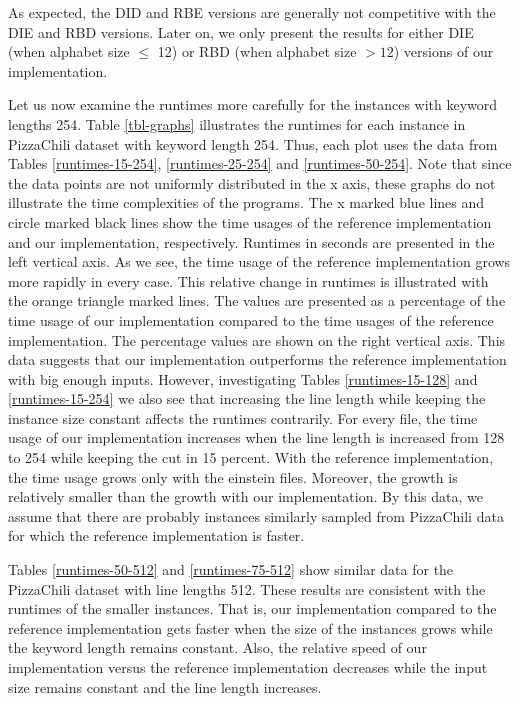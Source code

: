 \documentclass[english,twoside,censored,csm,algorithms-track-2020]{HYthesisML}
\theoremstyle{plain}
\theoremstyle{definition}
\begin{document}
As expected, the DID and RBE versions are generally not competitive with the DIE
and RBD versions.
Later on, we only present the results for either DIE (when alphabet size $\leq$ 12)
or RBD (when alphabet size $>12$) versions of our implementation.

Let us now examine the runtimes more carefully for the instances with keyword lengths 254.
Table \ref{tbl-graphs} illustrates the runtimes for each instance in PizzaChili dataset
with keyword length 254.
Thus, each plot uses the data from Tables
\ref{runtimes-15-254}, \ref{runtimes-25-254} and \ref{runtimes-50-254}.
Note that since the data points are not uniformly distributed in the x axis,
these graphs do not illustrate the time complexities of the programs. 
The x marked blue lines and circle marked black lines show the time usages of the reference
implementation and our implementation, respectively. Runtimes in seconds are presented in the
left vertical axis. As we see, the time usage of the reference implementation grows
more rapidly in every case. This relative change in runtimes is illustrated with
the orange triangle marked lines.
The values are presented as a percentage of the time usage of our implementation
compared to the time usages of the reference implementation.
The percentage values are shown on the right vertical axis.
This data suggests that our implementation outperforms the reference implementation
with big enough inputs. However, investigating Tables \ref{runtimes-15-128} and
\ref{runtimes-15-254} we also see
that increasing the line length while keeping the instance size constant affects
the runtimes contrarily. For every file, the time usage of our implementation
increases when the line length is increased from 128 to 254 while keeping the
cut in 15 percent. With the reference implementation, the time usage grows only
with the einstein files. Moreover, the growth is relatively smaller than the growth with
our implementation. By this data, we assume that there are probably instances similarly sampled
from PizzaChili data for which the reference implementation is faster.

Tables \ref{runtimes-50-512} and \ref{runtimes-75-512} show similar data for the PizzaChili
dataset with line lengths 512. These results are consistent with the runtimes of the smaller instances.
That is, our implementation compared to the reference implementation gets faster when the size of
the instances grows while the keyword length remains constant. Also, the relative speed of our
implementation versus the reference implementation decreases while the input size remains constant and the
line length increases. 
\end{document}
